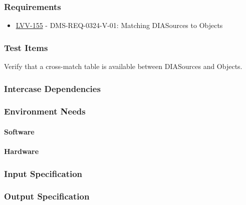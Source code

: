 \subsubsection{Requirements}
\begin{itemize}
\item \href{https://jira.lsstcorp.org/browse/LVV-155}{LVV-155} - DMS-REQ-0324-V-01: Matching DIASources to Objects
\end{itemize}

\subsubsection{Test Items}
Verify that a cross-match table is available between DIASources and
Objects.



\subsubsection{Intercase Dependencies}

\subsubsection{Environment Needs}

\paragraph{Software}

\paragraph{Hardware}

\subsubsection{Input Specification}

\subsubsection{Output Specification}

